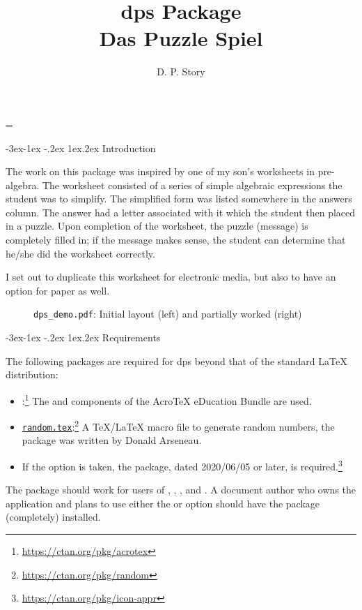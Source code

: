 \documentclass{article}
\title{dps Package\texorpdfstring{\\[1em]}{: }Das Puzzle Spiel}
\author{D. P. Story}
\makeatletter
\def\changelinkcolorto#1{\def\@linkcolor{#1}}
\renewcommand{\section}{%
   \renewcommand{\@seccntformat}[1]{\csname the##1\endcsname.\enspace}%
   \@startsection{section}{1}{-62.5pt}%
   {-3ex\@plus -1ex \@minus-.2ex}%
   {1ex\@plus .2ex}%
   {\noindent\normalfont\large\bfseries\color{blue}}}%
\makeatother
\begin{document}
\begingroup

\linewidth=\fullscreenwidth\relax
\maketitle

\endgroup

\changelinkcolorto{black}

\tableofcontents

\changelinkcolorto{webgreen}


\section{Introduction}

The work on this package was inspired by one of my son's worksheets
in pre-algebra. The worksheet consisted of a series of simple
algebraic expressions the student was to simplify. The simplified
form was listed somewhere in the answers column.  The answer had a
letter associated with it which the student then placed in a puzzle.
Upon completion of the worksheet, the puzzle (message) is completely
filled in; if the message makes sense, the student can determine
that he/she did the worksheet correctly.

I set out to duplicate this worksheet for electronic media, but
also to have an option for paper as well.
\begin{figure}[htb]\centering{}
\hfil
{}
\caption{\texttt{dps\_demo.pdf}: Initial layout (left) and partially worked (right)}
\end{figure}
\section{Requirements}

The following packages are required for \textsf{dps} beyond that of
the standard {\LaTeX} distribution:
\begin{itemize}
    \item {}:\footnote{\url{https://ctan.org/pkg/acrotex}} The
         and  components of the
        Acro\negthinspace\TeX{} eDucation Bundle are used.
    \item
        \texttt{\href{https://ctan.org/pkg/random}{random.tex}}:\footnote{\url{https://ctan.org/pkg/random}}
        A \TeX/\LaTeX{} macro file to generate random numbers, the package
        was written by Donald Arseneau.
    \item If the  option is taken, the 
        package, dated 2020/06/05 or later, is
        required.\footnote{\url{https://ctan.org/pkg/icon-appr}}
\end{itemize}
The package should work for users of , ,
, and . A document author who owns the
 application and plans to use either the  or
 option should have the  package (completely) installed.
\end{document}
